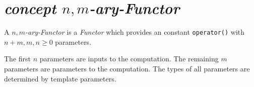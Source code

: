 %
%
%
%
%
%
%

\section{\textit{concept $n,m$-ary-Functor}}
A \textit{$n,m$-ary-Functor} is a \textit{Functor} which provides an constant \texttt{operator()} with $n+m, m, n \geq 0$ parameters.\newline

\noindent{}The first $n$ parameters are inputs to the computation.
The remaining $m$ parameters are parameters to the computation.
The types of all parameters are determined by template parameters.

